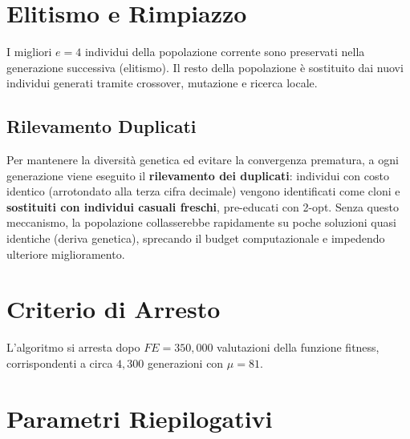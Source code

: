 \begin{algorithm}[H]
{    
}
\;
\end{algorithm}

\section{Elitismo e Rimpiazzo}

I migliori $e = 4$ individui della popolazione corrente sono preservati nella
generazione successiva (elitismo). Il resto della popolazione \`e sostituito
dai nuovi individui generati tramite crossover, mutazione e ricerca locale.

\subsection{Rilevamento Duplicati}

Per mantenere la diversit\`a genetica ed evitare la convergenza prematura, a ogni
generazione viene eseguito il \textbf{rilevamento dei duplicati}: individui con costo
identico (arrotondato alla terza cifra decimale) vengono identificati come cloni e
\textbf{sostituiti con individui casuali freschi}, pre-educati con 2-opt. Senza
questo meccanismo, la popolazione collasserebbe rapidamente su poche soluzioni quasi
identiche (deriva genetica), sprecando il budget computazionale e impedendo ulteriore
miglioramento.

\section{Criterio di Arresto}

L'algoritmo si arresta dopo $FE = 350{,}000$ valutazioni della funzione fitness,
corrispondenti a circa $4{,}300$ generazioni con $\mu = 81$.

\section{Parametri Riepilogativi}

